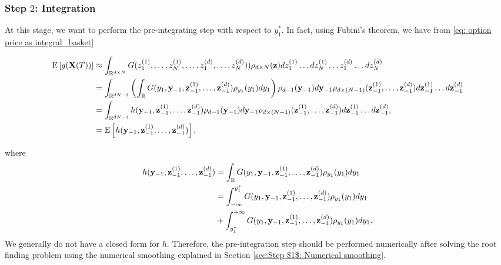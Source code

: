 \subsubsection{Step $2$: Integration}\label{sec:Step $2$: Integration}
At this stage, we want to perform the pre-integrating step with respect to  $y^\ast_1$. In fact, using Fubini's theorem, we have from \eqref{eq: option price as integral_basket}
\begin{small}
\begin{align}\label{eq: pre_integration_step_wrt_y1_basket}
	\mathrm{E}\left[g(\mathbf{X}(T))\right]&\approx\int_{\mathbb{R}^{d \times N}} G(z_1^{(1)}, \dots, z_N^{(1)}, \dots, z_1^{(d)},\dots,z^{(d)}_N)) \rho_{d \times N}(\mathbf{z}) dz_1^{(1)} \dots dz_N^{(1)} \dots z_1^{(d)} \dots dz^{(d)}_N \nonumber\\ 
	&=\int_{\mathbb{R}^{dN-1}} \left(\int_{\mathbb{R}} G(y_1,\mathbf{y}_{-1},\mathbf{z}^{(1)}_{-1},\dots,\mathbf{z}^{(d)}_{-1} ) \rho_{y_1}(y_1) dy_1 \right)\rho_{d-1}(\mathbf{y}_{-1}) d\mathbf{y}_{-1} \rho_{d \times(N-1)}(\mathbf{z}_{-1}^{(1)},\dots,\mathbf{z}_{-1}^{(d)}) d\mathbf{z}_{-1}^{(1)}\dots d\mathbf{z}_{-1}^{(d)} \nonumber\\	
	&=\int_{\mathbb{R}^{dN-1}} h(\mathbf{y}_{-1},\mathbf{z}^{(1)}_{-1},\dots,\mathbf{z}^{(d)}_{-1} )\rho_{d-1}(\mathbf{y}_{-1}) d\mathbf{y}_{-1}  \rho_{d\times (N-1)}(\mathbf{z}_{-1}^{(1)},\dots,\mathbf{z}_{-1}^{(d)}) d\mathbf{z}^{(1)}_{-1} \dots d\mathbf{z}^{(d)}_{-1}, \\ \nonumber
	&=\mathrm{E}\left[h(\mathbf{y}_{-1}, \mathbf{z}^{(1)}_{-1},\dots,\mathbf{z}^{(d)}_{-1} )\right] ,
\end{align}
\end{small}
where
\begin{align}\label{eq:smooth_function_after_pre_integration}
 h(\mathbf{y}_{-1},\mathbf{z}^{(1)}_{-1},\dots,\mathbf{z}^{(d)}_{-1})&=\int_{\mathbb{R}} G(y_1,\mathbf{y}_{-1},\mathbf{z}^{(1)}_{-1},\dots,\mathbf{z}^{(d)}_{-1} ) \rho_{y_1}(y_1) dy_1 \nonumber\\
 &= \int_{-\infty}^{y^\ast_1} G(y_1,\mathbf{y}_{-1},\mathbf{z}^{(1)}_{-1},\dots,\mathbf{z}^{(d)}_{-1} ) \rho_{y_1}(y_1) dy_1\nonumber\\
 &+ \int_{y_1^\ast}^{+\infty} G(y_1,\mathbf{y}_{-1},\mathbf{z}^{(1)}_{-1},\dots,\mathbf{z}^{(d)}_{-1} ) \rho_{y_1}(y_1) dy_1 .
\end{align}
We generally do not have a closed form for $h$. Therefore, the pre-integration step should be performed numerically after solving the root finding problem using the numerical smoothing explained in Section \ref{sec:Step $1$: Numerical smoothing}.


